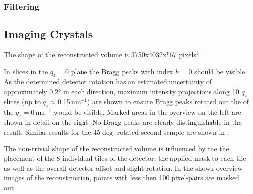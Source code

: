 \subsubsection{Filtering}
\subsection{Imaging Crystals}
The shape of the reconstructed volume is 3750x4032x567 pixels$^3$.

 In slices in the $q_z=0$ plane the Bragg peaks with index $h=0$ should be visible. As the determined detector rotation has an estimated uncertainty of approximately 0.2° in each direction, maximum intensity projections along 10 $q_z$ slices (up to $q_z\approx$0.15\,nm$^{-1}$) are shown to ensure Bragg peaks rotated out the of the $q_z=0$\,nm$^{-1}$ would be visible. Marked areas in the overview on the left are shown in detail on the right.  No Bragg peaks are clearly distinguishable in the result.
 Similar results for the 45$\deg$ rotated second sample are shown in .
 
 The non-trivial shape of the reconstructed volume is influenced by the the placement of the 8 individual tiles of the detector, the applied mask to each tile as well as the overall detector offset and slight rotation. In the shown overview images of the reconstruction, points with less then 100 pixel-pairs are masked out.
 
